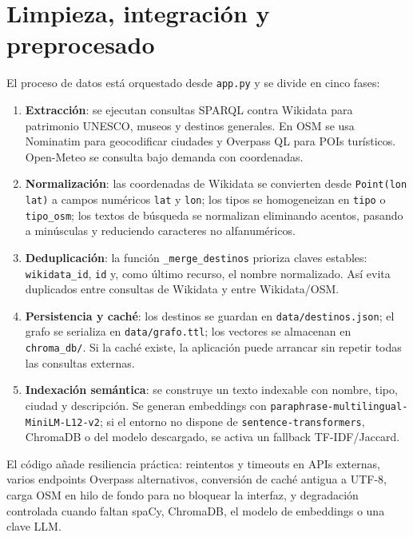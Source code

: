\documentclass[10pt,a4paper]{article}
\newcommand{\separaseccion}{\vspace{0.65\baselineskip}}
\begin{document}
\separaseccion{}
\section{Limpieza, integración y preprocesado}

El proceso de datos está orquestado desde \texttt{app.py} y se divide en cinco fases:

\begin{enumerate}
  \item \textbf{Extracción}: se ejecutan consultas SPARQL contra Wikidata para patrimonio UNESCO, museos y destinos generales. En OSM se usa Nominatim para geocodificar ciudades y Overpass QL para POIs turísticos. Open-Meteo se consulta bajo demanda con coordenadas.
  \item \textbf{Normalización}: las coordenadas de Wikidata se convierten desde \texttt{Point(lon lat)} a campos numéricos \texttt{lat} y \texttt{lon}; los tipos se homogeneizan en \texttt{tipo} o \texttt{tipo\_osm}; los textos de búsqueda se normalizan eliminando acentos, pasando a minúsculas y reduciendo caracteres no alfanuméricos.
  \item \textbf{Deduplicación}: la función \texttt{\_merge\_destinos} prioriza claves estables: \texttt{wikidata\_id}, \texttt{id} y, como último recurso, el nombre normalizado. Así evita duplicados entre consultas de Wikidata y entre Wikidata/OSM.
  \item \textbf{Persistencia y caché}: los destinos se guardan en \texttt{data/destinos.json}; el grafo se serializa en \texttt{data/grafo.ttl}; los vectores se almacenan en \texttt{chroma\_db/}. Si la caché existe, la aplicación puede arrancar sin repetir todas las consultas externas.
  \item \textbf{Indexación semántica}: se construye un texto indexable con nombre, tipo, ciudad y descripción. Se generan embeddings con \texttt{paraphrase-multilingual-MiniLM-L12-v2}; si el entorno no dispone de \texttt{sentence-transformers}, ChromaDB o del modelo descargado, se activa un fallback TF-IDF/Jaccard.
\end{enumerate}

El código añade resiliencia práctica: reintentos y timeouts en APIs externas, varios endpoints Overpass alternativos, conversión de caché antigua a UTF-8, carga OSM en hilo de fondo para no bloquear la interfaz, y degradación controlada cuando faltan spaCy, ChromaDB, el modelo de embeddings o una clave LLM.
\end{document}
